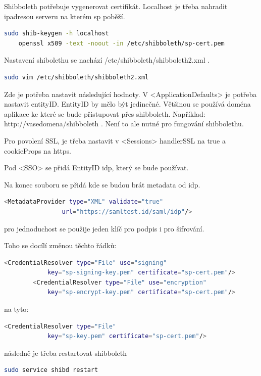Shibboleth potřebuje vygenerovat certifikát. Localhost je třeba nahradit ipadresou serveru na kterém sp poběží.
\begin{lstlisting}[language=Bash]
    sudo shib-keygen -h localhost
    openssl x509 -text -noout -in /etc/shibboleth/sp-cert.pem
\end{lstlisting}

Nastavení shibolethu se nachází /etc/shibboleth/shibboleth2.xml .

\begin{lstlisting}[language=Bash]
   sudo vim /etc/shibboleth/shibboleth2.xml
\end{lstlisting}

Zde je potřeba nastavit následující hodnoty. V <ApplicationDefaults> je potřeba nastavit entityID. EntityID by mělo být jedinečné. Většinou se používá doména aplikace ke které se bude přistupovat přes shibboleth. Například: http://vasedomena/shibboleth . Není to ale nutné pro fungování shibbolethu.

Pro povolení SSL, je třeba nastavit v <Sessions>  handlerSSL na true a cookieProps na https.

Pod <SSO> se přidá EntityID idp, který se bude používat.

Na konec souboru se přidá kde se budou brát metadata od idp.
\begin{lstlisting}[language=Bash]
 <MetadataProvider type="XML" validate="true"
                url="https://samltest.id/saml/idp"/>
\end{lstlisting}

pro jednoduchost se použije jeden klíč pro podpis i pro šifrování.

Toho se docílí změnou těchto řádků:
\begin{lstlisting}[language=Bash]
<CredentialResolver type="File" use="signing"
            key="sp-signing-key.pem" certificate="sp-cert.pem"/>
        <CredentialResolver type="File" use="encryption"
            key="sp-encrypt-key.pem" certificate="sp-cert.pem"/>
\end{lstlisting}

na tyto:
\begin{lstlisting}[language=Bash]
<CredentialResolver type="File"
            key="sp-key.pem" certificate="sp-cert.pem"/>
\end{lstlisting}

následně je třeba restartovat shibboleth
\begin{lstlisting}[language=Bash]
sudo service shibd restart
\end{lstlisting}

